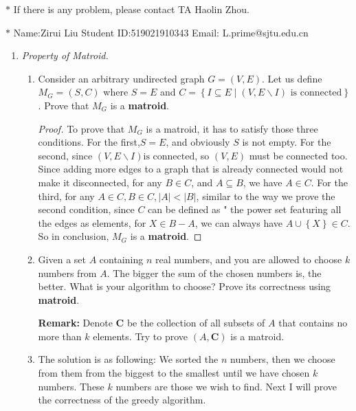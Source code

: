 \documentclass[12pt,a4paper]{article}
\makeatletter
\newtheorem*{solution}{Solution}
\theoremstyle{definition}
\renewenvironment{solution}[1][Solution] {\par\pushQED{\qed}\normalfont\topsep6\p@\@plus6\p@\relax\trivlist\item[\hskip\labelsep\bfseries#1\@addpunct{.}]\ignorespaces}{\popQED\endtrivlist\@endpefalse} \makeatother
\makeatother
\begin{document}
\noindent

\noindent{}
\begin{center}
\footnotesize{\color{red}$*$ If there is any problem, please contact TA Haolin Zhou.}

\footnotesize{\color{blue}$*$ Name:Zirui Liu  \quad Student ID:519021910343 \quad Email: L.prime@sjtu.edu.cn}
\end{center}

\begin{enumerate}
\item \textit{Property of Matroid.} 
\begin{enumerate}
	\item
	Consider an arbitrary undirected graph $ G=(V,E) $. Let us define $ M_{G}=(S,C) $ where $ S=E $ and $ C=\left\{I \subseteq E \mid\left(V, E \backslash I\right) \text { is connected}\right\} $. Prove that $ M_{G} $ is a \textbf{matroid}.\par
	    \begin{proof}
	        To prove that $M_G$ is a matroid, it has to satisfy those three conditions. For the first,$S=E$, and obviously $S$ is not empty. For the second, since $\left(V, E \backslash I\right) \text {is connected} $, so $\left(V, E\right)$ must be connected too. Since adding more edges to a graph that is already connected would not make it disconnected, for any $B \in C$, and $A \subseteq B$, we have $A \in C$. For the third, for any $A \in C, B \in C, |A| < |B|$, similar to the way we prove the second condition, since $C$ can be defined as " the power set featuring all the edges as elements, for $X \in B-A $, we can always have $A \cup \left\{ X \right\} \in C$. So in conclusion, $ M_{G} $ is a \textbf{matroid}. 
	        
	    \end{proof}
	\item
	Given a set $A$ containing $n$ real numbers, and you are allowed to choose $k$ numbers from $A$. The bigger the sum of the chosen numbers is, the better. What is your algorithm to choose? Prove its correctness using \textbf{matroid}.\par
	\textbf{Remark:} Denote $\mathbf{C}$ be the collection of all subsets of $A$ that contains no more than $k$ elements. Try to prove $(A,\mathbf{C})$ is a matroid.\par
	    \begin{solution}
	        The solution is as following: We sorted the $n$ numbers, then we choose from them from the biggest to the smallest until we have chosen $k$ numbers. These $k$ numbers are those we wish to find. Next I will prove the correctness of the greedy algorithm. 
	        

\end{solution}
\end{enumerate}
\end{enumerate}
\end{document}
